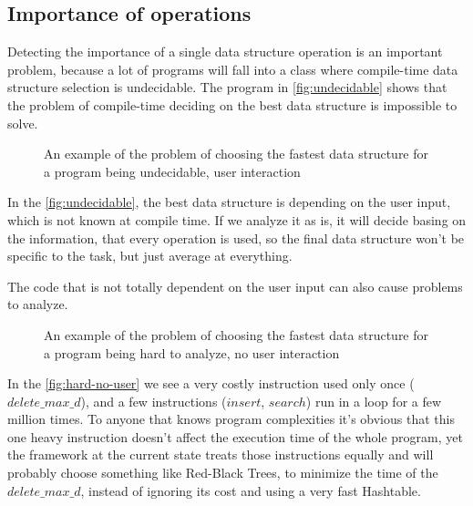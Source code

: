\documentclass[a4paper,11pt]{article}
\begin{document}
	\subsection{Importance of operations} \label{sub:importance}

		Detecting the importance of a single data structure operation is an important problem, because a lot of
		programs will fall into a class where compile-time data structure selection is undecidable. The
        program in \autoref{fig:undecidable} shows that the problem of compile-time deciding on the best data structure
        is impossible to solve.

        \begin{figure}[!h]
			

			\caption{An example of the problem of choosing the fastest data structure for a program being
			undecidable, user interaction}

			\label{fig:undecidable}
		\end{figure}

		In the \autoref{fig:undecidable}, the best data structure is depending on the user input, which is not known at
		compile time. If we analyze it as is, it will decide basing on the information, that every operation is
		used, so the final data structure won't be specific to the task, but just average at everything.

		The code that is not totally dependent on the user input can also cause problems to analyze.

        \begin{figure}[!h]
			

			\caption{An example of the problem of choosing the fastest data structure for a program being hard to
            analyze, no user interaction}

			\label{fig:hard-no-user}
		\end{figure}

		In the \autoref{fig:hard-no-user} we see a very costly instruction used only once
		($delete\_max\_d$), and a few instructions ($insert$, $search$) run in a loop for a few million times.
		To anyone that knows program complexities it's obvious that this one heavy instruction doesn't affect
		the execution time of the whole program, yet the framework at the current state treats those
		instructions equally and will probably choose something like Red-Black Trees, to minimize the time of
		the $delete\_max\_d$, instead of ignoring its cost and using a very fast Hashtable.
\end{document}
